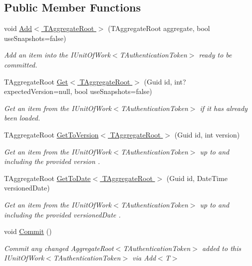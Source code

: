 \subsection*{Public Member Functions}
\begin{DoxyCompactItemize}
\item 
void \hyperlink{interfaceCqrs_1_1Domain_1_1IUnitOfWork_a1899165061529d5c9e77429b1fa72189_a1899165061529d5c9e77429b1fa72189}{Add$<$ T\+Aggregate\+Root $>$} (T\+Aggregate\+Root aggregate, bool use\+Snapshots=false)
\begin{DoxyCompactList}\small\item\em Add an item into the I\+Unit\+Of\+Work$<$\+T\+Authentication\+Token$>$ ready to be committed. \end{DoxyCompactList}\item 
T\+Aggregate\+Root \hyperlink{interfaceCqrs_1_1Domain_1_1IUnitOfWork_aee78f81d472577a65356bc1c05207180_aee78f81d472577a65356bc1c05207180}{Get$<$ T\+Aggregate\+Root $>$} (Guid id, int? expected\+Version=null, bool use\+Snapshots=false)
\begin{DoxyCompactList}\small\item\em Get an item from the I\+Unit\+Of\+Work$<$\+T\+Authentication\+Token$>$ if it has already been loaded. \end{DoxyCompactList}\item 
T\+Aggregate\+Root \hyperlink{interfaceCqrs_1_1Domain_1_1IUnitOfWork_a449dde9a112fcce6aaab0e4c8b3b9a71_a449dde9a112fcce6aaab0e4c8b3b9a71}{Get\+To\+Version$<$ T\+Aggregate\+Root $>$} (Guid id, int version)
\begin{DoxyCompactList}\small\item\em Get an item from the I\+Unit\+Of\+Work$<$\+T\+Authentication\+Token$>$ up to and including the provided {\itshape version} . \end{DoxyCompactList}\item 
T\+Aggregate\+Root \hyperlink{interfaceCqrs_1_1Domain_1_1IUnitOfWork_a9878de7ddb925b1ef2193b8734d79a3a_a9878de7ddb925b1ef2193b8734d79a3a}{Get\+To\+Date$<$ T\+Aggregate\+Root $>$} (Guid id, Date\+Time versioned\+Date)
\begin{DoxyCompactList}\small\item\em Get an item from the I\+Unit\+Of\+Work$<$\+T\+Authentication\+Token$>$ up to and including the provided {\itshape versioned\+Date} . \end{DoxyCompactList}\item 
void \hyperlink{interfaceCqrs_1_1Domain_1_1IUnitOfWork_ade600c9bf9e8380c24eaf1e7e0df6e01_ade600c9bf9e8380c24eaf1e7e0df6e01}{Commit} ()
\begin{DoxyCompactList}\small\item\em Commit any changed Aggregate\+Root$<$\+T\+Authentication\+Token$>$ added to this I\+Unit\+Of\+Work$<$\+T\+Authentication\+Token$>$ via Add$<$\+T$>$ \end{DoxyCompactList}\end{DoxyCompactItemize}


